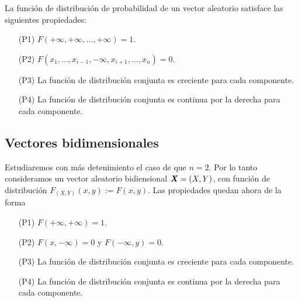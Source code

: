\begin{teo}
La función de distribución de probabilidad de un vector aleatorio satisface las siguientes propiedades:
\begin{enumerate}
    \item[(P1)] $F(+\infty,+\infty,...,+\infty) = 1$.
    \item[(P2)] $F(x_1,...,x_{i-1},-\infty,x_{i+1},...,x_n) = 0$.
    \item[(P3)] La función de distribución conjunta es creciente para cada componente.
    \item[(P4)] La función de distribución conjunta es continua por la derecha para cada componente.
\end{enumerate}
\end{teo}

\subsection{Vectores bidimensionales}

Estudiaremos con más detenimiento el caso de que $n = 2$. Por lo tanto consideramos un vector aleatorio bidiensional $\textbf{\textit{X}} = (X,Y)$, con función de distribución $F_{(X,Y)}(x,y) := F(x,y)$. Las propiedades quedan ahora de la forma
\begin{teo}
\begin{enumerate}
    \item[(P1)] $F(+\infty,+\infty) = 1$.
    \item[(P2)] $F(x,-\infty) = 0$ y $F(-\infty,y) = 0$.
    \item[(P3)] La función de distribución conjunta es creciente para cada componente.
    \item[(P4)] La función de distribución conjunta es continua por la derecha para cada componente.
\end{enumerate}
\end{teo}

